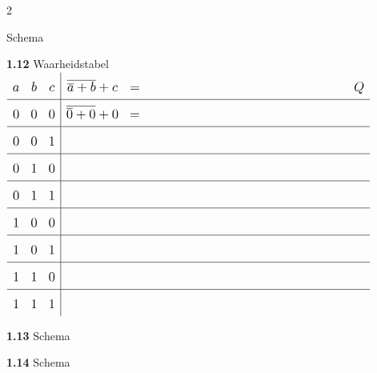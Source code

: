 \documentclass[a4paper,12pt]{paper}
\begin{document}
\begin{multicols}{2}
\begin{tcolorbox}
Schema

\vspace{7.55cm}
\end{tcolorbox}

\columnbreak

\begin{tcolorbox}
\textbf{1.12} Waarheidstabel\\[0.7em]
\(
{\renewcommand{\arraystretch}{1.7}
\large
\begin{array}{ccc|ccccccccccc}
a & b & c &  \overline{\overline{a} + b} + c &=&\hspace{10.3em}&&&&&&Q\\\hline
0 & 0 & 0 & \overline{\overline{0} + 0} + 0 &=&\\\hline
0 & 0 & 1 & \\\hline
0 & 1 & 0 &  \\\hline
0 & 1 & 1 & \\\hline
1 & 0 & 0 &   \\\hline
1 & 0 & 1 &   \\\hline
1 & 1 & 0 &   \\\hline
1 & 1 & 1 &  
\end{array}}
\)
\end{tcolorbox}


\begin{tcolorbox}
\textbf{1.13}
Schema

\vspace{7.2cm}
\end{tcolorbox}


\begin{tcolorbox}
\textbf{1.14}
Schema

\vspace{18.51cm}
\end{tcolorbox}
\end{multicols}
\end{document}
